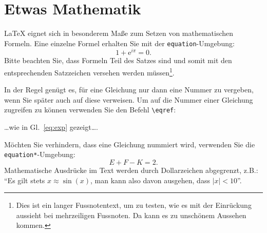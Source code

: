 \documentclass[arbeit=studie,oneside,BCOR=12mm]{ArbeitRST}
\begin{document}
\section{Etwas Mathematik}
\LaTeX{} eignet sich in besonderem Maße zum Setzen von mathematischen Formeln. Eine einzelne Formel erhalten Sie mit der \texttt{equation}-Umgebung:
\begin{equation}\label{eq:exp}
1 + \mathrm{e}^{i\pi} = 0.
\end{equation}
Bitte beachten Sie, dass Formeln Teil des Satzes sind und somit mit den entsprechenden Satzzeichen versehen werden müssen\footnote{Dies ist ein langer Fussnotentext, um zu testen, wie es mit der Einrückung aussieht bei mehrzeiligen Fussnoten. Da kann es zu unschönem Aussehen kommen.}.

In der Regel genügt es, für eine Gleichung nur dann eine Nummer zu vergeben, wenn Sie später auch auf diese verweisen. Um auf die Nummer einer Gleichung zugreifen zu können verwenden Sie den Befehl \texttt{\textbackslash eqref}: 
\begin{center}
\ldots wie in Gl.\ \eqref{eq:exp} gezeigt\ldots	.
\end{center}
Möchten Sie verhindern, dass eine Gleichung nummiert wird, verwenden Sie die \texttt{equation*}-Umgebung:
\begin{equation*}
E + F - K = 2.
\end{equation*}
Mathematische Ausdrücke im Text werden durch Dollarzeichen abgegrenzt, z.B.: "`Es gilt stets $x \approx \sin(x)$, man kann also davon ausgehen, dass $|x| < 10$"'.
\end{document}
